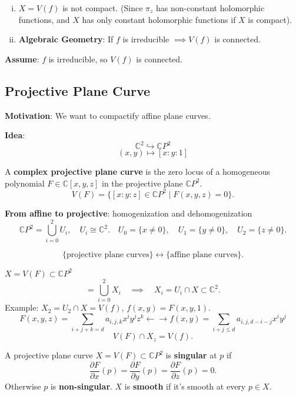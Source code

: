 \documentclass{article}
\begin{document}
\begin{remark}
\begin{enumerate}[(i)]
    \item $X = V(f)$ is not compact.
    (Since $\pi_z$ has non-constant holomorphic functions, and $X$ has only constant holomorphic functions if $X$ is compact).
    \item \textbf{Algebraic Geometry}: If $f$ is irreducible $\implies V(f)$ is connected.
\end{enumerate}
\end{remark}

\textbf{Assume}: $f$ is irreducible, so $V(f)$ is connected.

\subsection{Projective Plane Curve}

\textbf{Motivation}: We want to compactify affine plane curves.

\textbf{Idea}:
$$
\mathbb{C}^2 \hookrightarrow \mathbb{C} P^2
$$
$$
(x, y) \mapsto [x: y: 1]
$$

\begin{definition}
A \textbf{complex projective plane curve} is the zero locus of a homogeneous polynomial $F \in \mathbb{C}[x, y, z]$ in the projective plane $\mathbb{C} P^2$.
$$
V(F) = \{ [x: y: z] \in \mathbb{C} P^2 \mid F(x, y, z) = 0 \}.
$$
\end{definition}

\textbf{From affine to projective}: homogenization and dehomogenization
$$
\mathbb{C} P^2 = \bigcup_{i=0}^2 U_i, \quad U_i \cong \mathbb{C}^2. \quad U_0 = \{ x \ne 0 \}, \quad U_1 = \{ y \ne 0 \}, \quad U_2 = \{ z \ne 0 \}.
$$

$$
\{ \text{projective plane curves} \} \longleftrightarrow \{ \text{affine plane curves} \}.
$$

$X = V(F) \subset \mathbb{C} P^2$
$$
= \bigcup_{i=0}^2 X_i \quad \implies \quad X_i = U_i \cap X \subset \mathbb{C}^2.
$$
Example: $X_2 = U_2 \cap X = V(f)$, $f(x, y) = F(x, y, 1)$.
$$
F(x, y, z) = \sum_{i+j+k=d} a_{i, j, k} x^i y^j z^k
\longleftarrow \longrightarrow
f(x, y) = \sum_{i+j \le d} a_{i, j, d-i-j} x^i y^j
$$
$$
V(F) \cap X_z = V(f).
$$

\begin{definition}
A projective plane curve $X = V(F) \subset \mathbb{C} P^2$ is \textbf{singular} at $p$ if
$$
\frac{\partial F}{\partial x} (p) = \frac{\partial F}{\partial y} (p) = \frac{\partial F}{\partial z} (p) = 0.
$$
Otherwise $p$ is \textbf{non-singular}. $X$ is \textbf{smooth} if it's smooth at every $p \in X$.
\end{definition}
\end{document}

